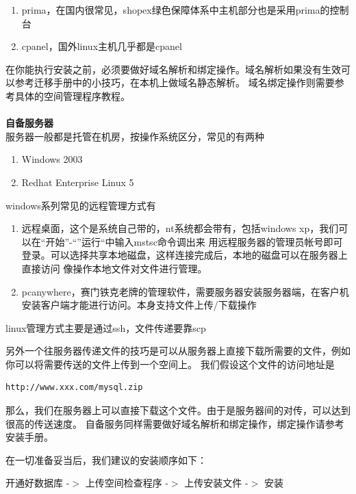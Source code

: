\documentclass{article}
\begin{document}
\begin{enumerate}
\item prima，在国内很常见，shopex绿色保障体系中主机部分也是采用prima的控制台
\item cpanel，国外linux主机几乎都是cpanel
\end{enumerate}

在你能执行安装之前，必须要做好域名解析和绑定操作。域名解析如果没有生效可以参考迁移手册中的小技巧，在本机上做域名静态解析。
域名绑定操作则需要参考具体的空间管理程序教程。

\paragraph{}\textbf{自备服务器}\\

服务器一般都是托管在机房，按操作系统区分，常见的有两种

\begin{enumerate}
\item Windows  2003
\item Redhat Enterprise Linux 5
\end{enumerate}

windows系列常见的远程管理方式有

\begin{enumerate}
\item 远程桌面，这个是系统自己带的，nt系统都会带有，包括windows xp，我们可以在“开始”-“”运行“中输入mstsc命令调出来
  用远程服务器的管理员帐号即可登录。可以选择共享本地磁盘，这样连接完成后，本地的磁盘可以在服务器上直接访问
  像操作本地文件对文件进行管理。
\item pcanywhere，赛门铁克老牌的管理软件，需要服务器安装服务器端，在客户机安装客户端才能进行访问。本身支持文件上传/下载操作
\end{enumerate}

linux管理方式主要是通过ssh，文件传递要靠scp

另外一个往服务器传递文件的技巧是可以从服务器上直接下载所需要的文件，例如你可以将需要传送的文件上传到一个空间上。
我们假设这个文件的访问地址是

\begin{verbatim}
http://www.xxx.com/mysql.zip
\end{verbatim}
那么，我们在服务器上可以直接下载这个文件。由于是服务器间的对传，可以达到很高的传送速度。
自备服务同样需要做好域名解析和绑定操作，绑定操作请参考安装手册。

在一切准备妥当后，我们建议的安装顺序如下：

开通好数据库 -$>$ 上传空间检查程序 -$>$ 上传安装文件 -$>$ 安装
\end{document}
